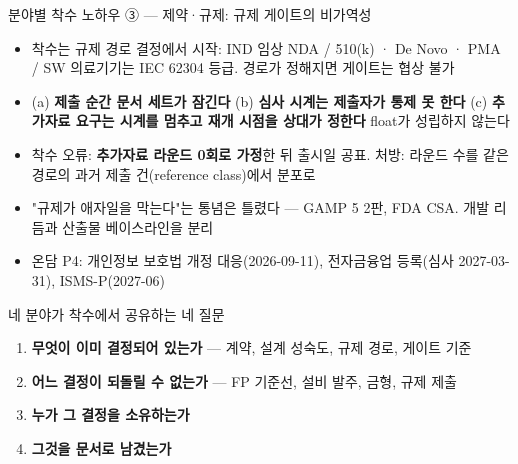 \begin{frame}{분야별 착수 노하우 ③ — 제약·규제: 규제 게이트의 비가역성}
\begin{itemize}
\item 착수는 규제 경로 결정에서 시작: IND \ra{} 임상 \ra{} NDA / 510(k) · De Novo · PMA / SW 의료기기는 IEC 62304 등급. 경로가 정해지면 게이트는 협상 불가
\item (a) \textbf{제출 순간 문서 세트가 잠긴다} (b) \textbf{심사 시계는 제출자가 통제 못 한다} (c) \textbf{추가자료 요구는 시계를 멈추고 재개 시점을 상대가 정한다} \ra{} float가 성립하지 않는다
\item 착수 오류: \textbf{추가자료 라운드 0회로 가정}한 뒤 출시일 공표. 처방: 라운드 수를 같은 경로의 과거 제출 건(reference class)에서 분포로
\item "규제가 애자일을 막는다"는 통념은 틀렸다 — GAMP 5 2판, FDA CSA. 개발 리듬과 산출물 베이스라인을 분리
\item 온담 P4: 개인정보 보호법 개정 대응(2026-09-11), 전자금융업 등록(심사 2027-03-31), ISMS-P(2027-06)
\end{itemize}
\end{frame}

\begin{frame}{네 분야가 착수에서 공유하는 네 질문}
\begin{enumerate}
\item \textbf{무엇이 이미 결정되어 있는가} — 계약, 설계 성숙도, 규제 경로, 게이트 기준
\item \textbf{어느 결정이 되돌릴 수 없는가} — FP 기준선, 설비 발주, 금형, 규제 제출
\item \textbf{누가 그 결정을 소유하는가}
\item \textbf{그것을 문서로 남겼는가}
\end{enumerate}
\end{frame}

